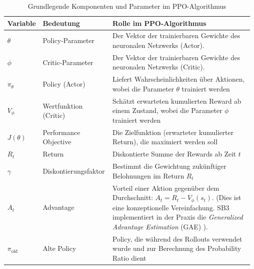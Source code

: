 \begin{table}[H]
\centering
\begin{tabular}{|p{2cm}|p{3cm}|p{7cm}|} 
\hline
\textbf{Variable} & \textbf{Bedeutung} & \textbf{Rolle im \ac{PPO}\hyp{}Algorithmus} \\
\hline
$\theta$          & Policy\hyp{}Parameter & Der Vektor der trainierbaren Gewichte des neuronalen Netzwerks (Actor). \\
$\phi$            & Critic\hyp{}Parameter & Der Vektor der trainierbaren Gewichte des neuronalen Netzwerks (Critic). \\
$\pi_\theta$      & Policy (Actor)& Liefert Wahrscheinlichkeiten über Aktionen, wobei die Parameter $\theta$ trainiert werden \\
$V_\phi$          & Wertfunktion (Critic) & Schätzt erwarteten kumu\-lierten Reward ab einem Zu\-stand, wobei die Para\-meter $\phi$ trainiert werden \\
$J(\theta)$       & Performance Objective & Die Zielfunktion (erwarteter kumulierter Return), die maximiert werden soll \\
$R_t$             & Return & Diskontierte Summe der Rewards ab Zeit $t$ \\
$\gamma$          & Dis\-kont\-ie\-rungs\-faktor & Bestimmt die Ge\-wichtung zu\-künftiger Be\-lohnungen im Return $R_t$ \\
$A_t$             & Advantage & Vorteil einer Aktion gegen\-über dem Durch\-schnitt: $A_t = R_t - V_\phi(s_t)$. (Dies ist eine kon\-zep\-tio\-nelle Ver\-ein\-fachung. \ac{SB3} implementiert in der Praxis die \textit{Gene\-ralized Advantage Esti\-mation} (GAE) \cite{sb3, gae}). \\
$\pi_{\text{old}}$ & Alte Policy & Policy, die während des Rollouts verwendet wurde und zur Berechnung des Probability Ratio dient \\
\hline
\end{tabular}
\caption{Grundlegende Komponenten und Parameter im \ac{PPO}\hyp{}Algorithmus}
\label{tab:ppo_vars_part1}
\end{table}

